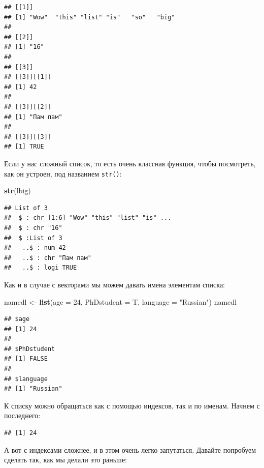 \documentclass[]{book}
\newenvironment{Shaded}{\begin{snugshade}}{\end{snugshade}}
\newcommand{\DataTypeTok}[1]{\textcolor[rgb]{0.13,0.29,0.53}{#1}}
\newcommand{\DecValTok}[1]{\textcolor[rgb]{0.00,0.00,0.81}{#1}}
\newcommand{\KeywordTok}[1]{\textcolor[rgb]{0.13,0.29,0.53}{\textbf{#1}}}
\newcommand{\NormalTok}[1]{#1}
\newcommand{\OperatorTok}[1]{\textcolor[rgb]{0.81,0.36,0.00}{\textbf{#1}}}
\newcommand{\StringTok}[1]{\textcolor[rgb]{0.31,0.60,0.02}{#1}}
\begin{document}
\begin{verbatim}
## [[1]]
## [1] "Wow"  "this" "list" "is"   "so"   "big" 
## 
## [[2]]
## [1] "16"
## 
## [[3]]
## [[3]][[1]]
## [1] 42
## 
## [[3]][[2]]
## [1] "Пам пам"
## 
## [[3]][[3]]
## [1] TRUE
\end{verbatim}

Если у нас сложный список, то есть очень классная функция, чтобы посмотреть, как он устроен, под названием \texttt{str()}:

\begin{Shaded}
\begin{Highlighting}[]
\KeywordTok{str}\NormalTok{(lbig)}
\end{Highlighting}
\end{Shaded}

\begin{verbatim}
## List of 3
##  $ : chr [1:6] "Wow" "this" "list" "is" ...
##  $ : chr "16"
##  $ :List of 3
##   ..$ : num 42
##   ..$ : chr "Пам пам"
##   ..$ : logi TRUE
\end{verbatim}

Как и в случае с векторами мы можем давать имена элементам списка:

\begin{Shaded}
\begin{Highlighting}[]
\NormalTok{namedl <-}\StringTok{ }\KeywordTok{list}\NormalTok{(}\DataTypeTok{age =} \DecValTok{24}\NormalTok{, }\DataTypeTok{PhDstudent =}\NormalTok{ T, }\DataTypeTok{language =} \StringTok{"Russian"}\NormalTok{)}
\NormalTok{namedl}
\end{Highlighting}
\end{Shaded}

\begin{verbatim}
## $age
## [1] 24
## 
## $PhDstudent
## [1] FALSE
## 
## $language
## [1] "Russian"
\end{verbatim}

К списку можно обращаться как с помощью индексов, так и по именам. Начнем с последнего:

\begin{Shaded}
\end{Shaded}

\begin{verbatim}
## [1] 24
\end{verbatim}

А вот с индексами сложнее, и в этом очень легко запутаться. Давайте попробуем сделать так, как мы делали это раньше:
\end{document}
